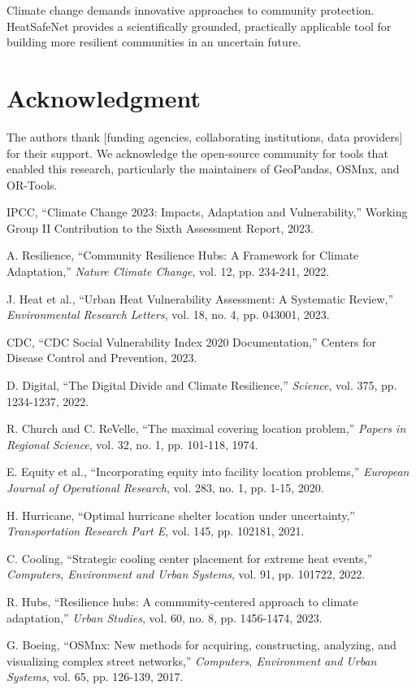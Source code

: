 \documentclass[conference]{IEEEtran}
\begin{document}
Climate change demands innovative approaches to community protection. HeatSafeNet provides a scientifically grounded, practically applicable tool for building more resilient communities in an uncertain future.

\section*{Acknowledgment}

The authors thank [funding agencies, collaborating institutions, data providers] for their support. We acknowledge the open-source community for tools that enabled this research, particularly the maintainers of GeoPandas, OSMnx, and OR-Tools.

\begin{thebibliography}{00}
 IPCC, ``Climate Change 2023: Impacts, Adaptation and Vulnerability,'' Working Group II Contribution to the Sixth Assessment Report, 2023.

 A. Resilience, ``Community Resilience Hubs: A Framework for Climate Adaptation,'' \emph{Nature Climate Change}, vol. 12, pp. 234-241, 2022.

 J. Heat et al., ``Urban Heat Vulnerability Assessment: A Systematic Review,'' \emph{Environmental Research Letters}, vol. 18, no. 4, pp. 043001, 2023.

 CDC, ``CDC Social Vulnerability Index 2020 Documentation,'' Centers for Disease Control and Prevention, 2023.

 D. Digital, ``The Digital Divide and Climate Resilience,'' \emph{Science}, vol. 375, pp. 1234-1237, 2022.

 R. Church and C. ReVelle, ``The maximal covering location problem,'' \emph{Papers in Regional Science}, vol. 32, no. 1, pp. 101-118, 1974.

 E. Equity et al., ``Incorporating equity into facility location problems,'' \emph{European Journal of Operational Research}, vol. 283, no. 1, pp. 1-15, 2020.

 H. Hurricane, ``Optimal hurricane shelter location under uncertainty,'' \emph{Transportation Research Part E}, vol. 145, pp. 102181, 2021.

 C. Cooling, ``Strategic cooling center placement for extreme heat events,'' \emph{Computers, Environment and Urban Systems}, vol. 91, pp. 101722, 2022.

 R. Hubs, ``Resilience hubs: A community-centered approach to climate adaptation,'' \emph{Urban Studies}, vol. 60, no. 8, pp. 1456-1474, 2023.

 G. Boeing, ``OSMnx: New methods for acquiring, constructing, analyzing, and visualizing complex street networks,'' \emph{Computers, Environment and Urban Systems}, vol. 65, pp. 126-139, 2017.

\end{thebibliography}
\end{document}
